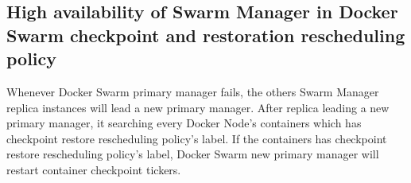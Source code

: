 \subsection{High availability of Swarm Manager in Docker Swarm checkpoint and restoration rescheduling policy}
Whenever Docker Swarm primary manager fails, the others Swarm Manager replica instances will lead a new primary manager. After replica leading a new primary manager, it searching every Docker Node's containers which has checkpoint restore rescheduling policy's label. If the containers has checkpoint restore rescheduling policy's label, Docker Swarm new primary manager will restart container checkpoint tickers.